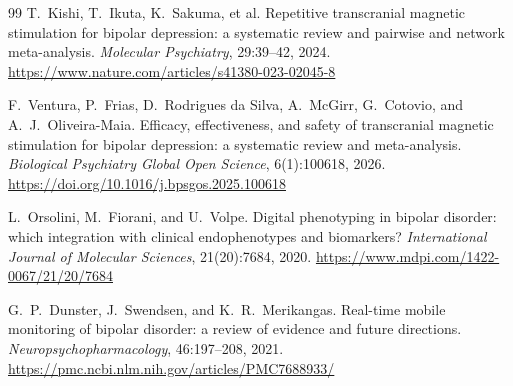 \documentclass[11pt]{article}
\theoremstyle{remark}
\theoremstyle{plain}
\begin{document}
\begin{thebibliography}{99}
T.\ Kishi, T.\ Ikuta, K.\ Sakuma, et al.
\newblock Repetitive transcranial magnetic stimulation for bipolar depression: a systematic review and pairwise and network meta-analysis.
\newblock \emph{Molecular Psychiatry}, 29:39--42, 2024.
\newblock \url{https://www.nature.com/articles/s41380-023-02045-8}

F.\ Ventura, P.\ Frias, D.\ Rodrigues da Silva, A.\ McGirr, G.\ Cotovio, and A.\ J.\ Oliveira-Maia.
\newblock Efficacy, effectiveness, and safety of transcranial magnetic stimulation for bipolar depression: a systematic review and meta-analysis.
\newblock \emph{Biological Psychiatry Global Open Science}, 6(1):100618, 2026.
\newblock \url{https://doi.org/10.1016/j.bpsgos.2025.100618}

L.\ Orsolini, M.\ Fiorani, and U.\ Volpe.
\newblock Digital phenotyping in bipolar disorder: which integration with clinical endophenotypes and biomarkers?
\newblock \emph{International Journal of Molecular Sciences}, 21(20):7684, 2020.
\newblock \url{https://www.mdpi.com/1422-0067/21/20/7684}

G.\ P.\ Dunster, J.\ Swendsen, and K.\ R.\ Merikangas.
\newblock Real-time mobile monitoring of bipolar disorder: a review of evidence and future directions.
\newblock \emph{Neuropsychopharmacology}, 46:197--208, 2021.
\newblock \url{https://pmc.ncbi.nlm.nih.gov/articles/PMC7688933/}

\end{thebibliography}
\end{document}
